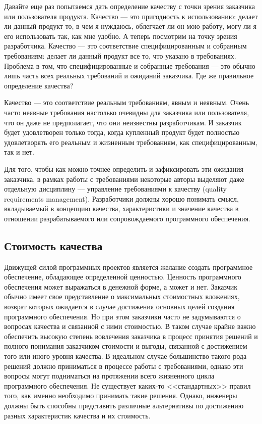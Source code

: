 \documentclass{../../text-style}
\begin{document}
Давайте еще раз попытаемся дать определение качеству с точки зрения заказчика или пользователя продукта. Качество --- это пригодность к использованию: делает ли данный продукт то, в чем я нуждаюсь, облегчает ли он мою работу, могу ли я его использовать так, как мне удобно. А теперь посмотрим на точку зрения разработчика. Качество --- это соответствие специфицированным и собранным требованиям: делает ли данный продукт все то, что указано в требованиях. Проблема в том, что специфицированные и собранные требования --- это обычно лишь часть всех реальных требований и ожиданий заказчика. Где же правильное определение качества?

Качество --- это соответствие реальным требованиям, явным и неявным. Очень часто неявные требования настолько очевидны для заказчика или пользователя, что он даже не предполагает, что они неизвестны разработчикам. И заказчик будет удовлетворен только тогда, когда купленный продукт будет полностью удовлетворять его реальным и жизненным требованиям, как специфицированным, так и нет.

Для того, чтобы как можно точнее определить и зафиксировать эти ожидания заказчика, в рамках работы с требованиями некоторые авторы выделяют даже отдельную дисциплину --- управление требованиями к качеству (quality requirements management). Разработчики должны хорошо понимать смысл, вкладываемый в концепцию качества, характеристики и значение качества в отношении разрабатываемого или сопровождаемого программного обеспечения.

\subsection{Стоимость качества}


Движущей силой программных проектов является желание создать программное обеспечение, обладающее определенной ценностью. Ценность программного обеспечения может выражаться в денежной форме, а может и нет. Заказчик обычно имеет свое представление о максимальных стоимостных вложениях, возврат которых ожидается в случае достижения основных целей создания программного обеспечения. Но при этом заказчики часто не задумываются о вопросах качества и связанной с ними стоимостью. В таком случае крайне важно обеспечить высокую степень вовлечения заказчика в процесс принятия решений и полного понимания заказчиком стоимости и выгоды, связанной с достижением того или иного уровня качества. В идеальном случае большинство такого рода решений должно приниматься в процессе работы с требованиями, однако эти вопросы могут подниматься на протяжении всего жизненного цикла программного обеспечения. Не существует каких-то <<стандартных>> правил того, как именно необходимо принимать такие решения. Однако, инженеры должны быть способны представить различные альтернативы по достижению разных характеристик качества и их стоимость.
\end{document}
